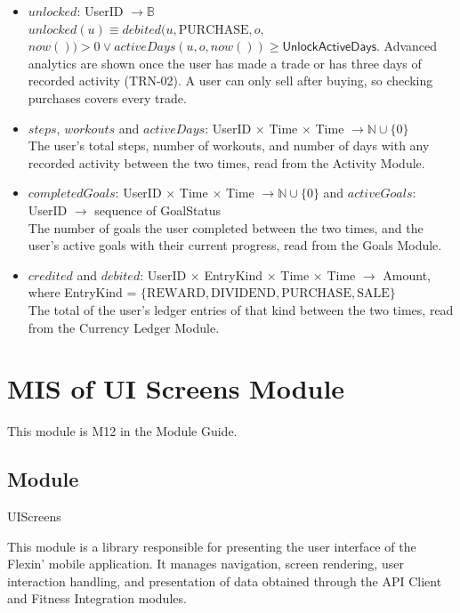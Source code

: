 \documentclass[12pt, titlepage]{article}
\begin{document}
\begin{itemize}
\item $\mathit{unlocked}$: UserID $\rightarrow \mathbb{B}$\\
  $\mathit{unlocked}(u) \equiv \mathit{debited}(u, \mathrm{PURCHASE}, o,$
  $\mathit{now}()) > 0 \vee \mathit{activeDays}(u, o, \mathit{now}()) \geq
  \textsf{UnlockActiveDays}$. Advanced analytics are shown once the user
  has made a trade or has three days of recorded activity (TRN-02). A user
  can only sell after buying, so checking purchases covers every trade.
\item $\mathit{steps}$, $\mathit{workouts}$ and $\mathit{activeDays}$:
  UserID $\times$ Time $\times$ Time $\rightarrow \mathbb{N} \cup \{0\}$\\
  The user's total steps, number of workouts, and number of days with any
  recorded activity between the two times, read from the Activity Module.
\item $\mathit{completedGoals}$: UserID $\times$ Time $\times$ Time
  $\rightarrow \mathbb{N} \cup \{0\}$ and $\mathit{activeGoals}$: UserID
  $\rightarrow$ sequence of GoalStatus\\
  The number of goals the user completed between the two times, and the
  user's active goals with their current progress, read from the Goals
  Module.
\item $\mathit{credited}$ and $\mathit{debited}$: UserID $\times$ EntryKind
  $\times$ Time $\times$ Time $\rightarrow$ Amount, where EntryKind =
  $\{\mathrm{REWARD}, \mathrm{DIVIDEND}, \mathrm{PURCHASE},
  \mathrm{SALE}\}$\\
  The total of the user's ledger entries of that kind between the two
  times, read from the Currency Ledger Module.
\end{itemize}

\section{MIS of UI Screens Module} \label{misUI}

This module is M12 in the Module Guide.

\subsection{Module}

UIScreens

\medskip

\noindent This module is a library responsible for presenting the user interface of the Flexin’ mobile application. It manages navigation, screen rendering, user interaction handling, and presentation of data obtained through the API Client and Fitness Integration modules.
\end{document}
